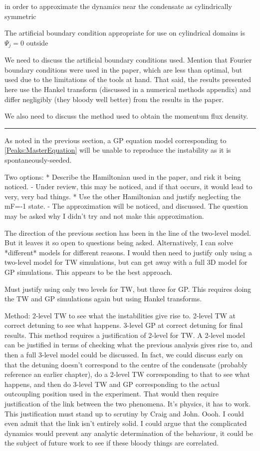 in order to approximate the dynamics near the condensate as cylindrically symmetric


The artificial boundary condition appropriate for use on cylindrical domains is $\Psi_j=0$ outside 


We need to discuss the artificial boundary conditions used. Mention that Fourier boundary conditions were used in the paper, which are less than optimal, but used due to the limitations of the tools at hand. That said, the results presented here use the Hankel transform (discussed in a numerical methods appendix) and differ negligibly (they bloody well better) from the results in the paper.

We also need to discuss the method used to obtain the momentum flux density.

\hrule



As noted in the previous section, a GP equation model corresponding to \eqref{Peaks:MasterEquation} will be unable to reproduce the instability as it is spontaneously-seeded. 



Two options: 
* Describe the Hamiltonian used in the paper, and risk it being noticed.
    - Under review, this may be noticed, and if that occurs, it would lead to very, very bad things.
* Use the other Hamiltonian and justify neglecting the mF=-1 state.
    - The approximation will be noticed, and discussed. The question may be asked why I didn't try and not make this approximation.

The direction of the previous section has been in the line of the two-level model. But it leaves it so open to questions being asked.
Alternatively, I can solve *different* models for different reasons. I would then need to justify only using a two-level model for TW simulations, but can get away with a full 3D model for GP simulations. This appears to be the best approach.

Must justify using only two levels for TW, but three for GP.
This requires doing the TW and GP simulations again but using Hankel transforms.

Method: 
    2-level TW to see what the instabilities give rise to.
    2-level TW at correct detuning to see what happens.
    3-level GP at correct detuning for final results.
This method requires a justification of 2-level for TW. A 2-level model can be justified in terms of checking what the previous analysis gives rise to, and then a full 3-level model could be discussed. In fact, we could discuss early on that the detuning doesn't correspond to the centre of the condensate (probably reference an earlier chapter), do a 2-level TW corresponding to that to see what happens, and then do 3-level TW and GP corresponding to the actual outcoupling position used in the experiment. That would then require justification of the link between the two phenomena. It's physics, it has to work. This justification must stand up to scrutiny by Craig and John. Oooh. I could even admit that the link isn't entirely solid. I could argue that the complicated dynamics would prevent any analytic determination of the behaviour, it could be the subject of future work to see if these bloody things are correlated.

